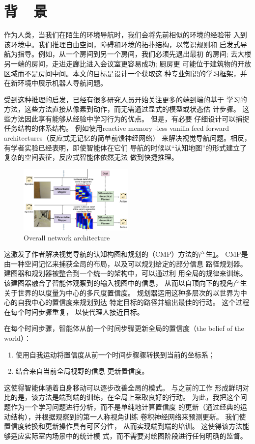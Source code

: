 \documentclass{thuemp}
\begin{document}
\section{背~~景}
作为人类，当我们在陌生的环境导航时，我们会将先前相似的环境的经验带
入到该环境中。我们推理自由空间，障碍和环境的拓扑结构，以常识规则和
启发式导航为指导。例如，从一个房间到另一个房间，我们必须先退出最初
的房间; 去大楼另一端的房间，走进走廊比进入会议室更容易成功; 厨房更
可能位于建筑物的开放区域而不是房间中间。本文的目标是设计一个获取这
种专业知识的学习框架，并在新环境中展示机器人导航问题。

受到这种推理的启发，已经有很多研究人员开始关注更多的端到端的基于
学习的方法，这些方法直接从像素到动作，而无需通过显式的模型或状态估
计步骤。 这些方法因此享有能够从经验中学习行为的优点。 但是，有必要
仔细设计可以捕捉任务结构的体系结构。 例如使用reactive memory
-less vanilla feed forward architectures（反应式无记忆的简单前馈神经网络）
来解决视觉导航问题。相反，有学者实验已经表明，即使智能体在它们
导航的时候以“认知地图”的形式建立了复杂的空间表征，反应式智能体依然无法
做到快捷推理。
\begin{figure}
  \centering
  \includegraphics[width=0.5\textwidth]{image/1.png}
  \caption{Overall network architecture}
  \label{fig:CMP_architecture}
\end{figure}

这激发了作者解决视觉导航的认知构图和规划的（CMP）方法的产生\ref{fig:CMP_architecture}。
 CMP是由一种空间记忆来捕获全局的布局，以及可以规划给定的部分信息
 路径规划器。 建图器和规划器被整合到一个统一的架构中，可以通过利
 用全局的规律来训练。 该建图器融合了智能体观察到的输入视图中的信息，
 从而以自顶向下的视角产生关于世界的以度量为中心的多尺度置信度。
  规划器运用这种多层次的以世界为中心的自我中心的置信度来规划到达
  特定目标的路径并输出最佳的行动。 这个过程在每个时间步骤重复，
  以使代理人接近目标。

  在每个时间步骤，智能体从前一个时间步骤更新全局的置信度（the 
  belief of the world）：
  \begin{enumerate}
    \item 使用自我运动将置信度从前一个时间步骤骤转换到当前的坐标系；
    \item 结合来自当前全局视野的信息 更新置信度。
  \end{enumerate}
  这使得智能体随着自身移动可以逐步改善全局的模式。 与之前的工作
  形成鲜明对比的是，该方法是端到端的训练，在全局上采取良好的行动。
  为此，我把这个问题作为一个学习问题进行分析，而不是单纯地计算置信度
  的更新（通过经典的运动结构），并根据观察到的第一人称视角训练
  卷积神经网络来预测更新。 我们使置信度转换和更新操作具有可区分性，
  从而实现端到端的培训。 这使得该方法能够适应实际室内场景中的统计模
  式，而不需要对绘图阶段进行任何明确的监督。
\end{document}
